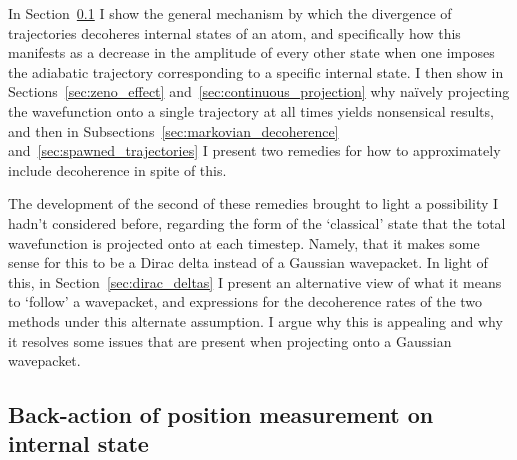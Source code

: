 In Section~\ref{sec:backaction} I show the general mechanism by which the divergence of trajectories decoheres internal states of an atom, and specifically how this manifests as a decrease in the amplitude of every other state when one imposes the adiabatic trajectory corresponding to a specific internal state. I then show in Sections~\ref{sec:zeno_effect} and~\ref{sec:continuous_projection} why na\"ively projecting the wavefunction onto a single trajectory at all times yields nonsensical results, and then in Subsections~\ref{sec:markovian_decoherence} and~\ref{sec:spawned_trajectories} I present two remedies for how to approximately include decoherence in spite of this. 

The development of the second of these remedies brought to light a possibility I hadn't considered before, regarding the form of the `classical' state that the total wavefunction is projected onto at each timestep. Namely, that it makes some sense for this to be a Dirac delta instead of a Gaussian wavepacket. In light of this, in Section~\ref{sec:dirac_deltas} I present an alternative view of what it means to `follow' a wavepacket, and expressions for the decoherence rates of the two methods under this alternate assumption. I argue why this is appealing and why it resolves some issues that are present when projecting onto a Gaussian wavepacket.

\subsection{Back-action of position measurement on internal state}\label{sec:backaction}

